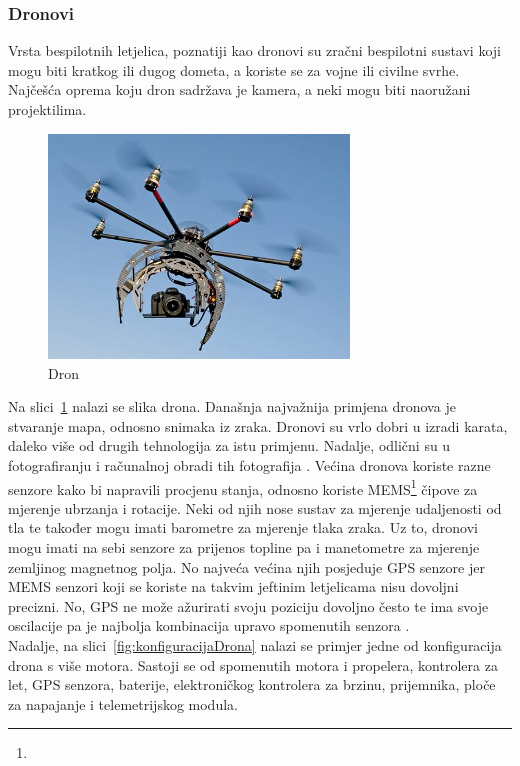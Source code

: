 \documentclass[times, utf8, diplomski]{fer}
\begin{document}
\subsubsection{Dronovi}
Vrsta bespilotnih letjelica, poznatiji kao dronovi su zračni bespilotni sustavi koji mogu biti kratkog ili dugog dometa, a koriste se za vojne ili civilne svrhe. Najčešća oprema koju dron sadržava je kamera, a neki mogu biti naoružani projektilima. 
\begin{figure}[htb]
\centering
\includegraphics[width=8cm]{img/drone.png}
\caption{Dron\protect\footnotemark}
\label{fig:dron}
\end{figure}
Na  slici~\ref{fig:dron}  nalazi  se  slika 
drona. Današnja najvažnija primjena dronova je stvaranje mapa, odnosno snimaka iz zraka. Dronovi su  vrlo dobri u izradi karata, daleko više od drugih tehnologija za istu primjenu. Nadalje, odlični su u fotografiranju i računalnoj  obradi  tih  fotografija \citep[str.~10]{Drones}. Većina dronova koriste razne senzore kako  bi  napravili  procjenu  stanja,  odnosno  koriste  MEMS\footnote{} čipove  za  mjerenje  ubrzanja  i rotacije. Neki od njih nose sustav za mjerenje udaljenosti od tla te također mogu imati barometre za  mjerenje  tlaka  zraka.  Uz  to,  dronovi  mogu  imati  na  sebi senzore  za  prijenos  topline  pa  i manetometre za mjerenje zemljinog magnetnog polja. No najveća većina njih posjeduje GPS senzore jer MEMS senzori koji se koriste na takvim jeftinim letjelicama nisu dovoljni precizni. No, GPS ne može ažurirati svoju poziciju dovoljno često te ima svoje oscilacije pa je najbolja kombinacija  upravo  spomenutih  senzora \citep[str.~13]{Drones}.\\
Nadalje, na slici~\ref{fig:konfiguracijaDrona} nalazi se primjer jedne od konfiguracija drona s više motora. Sastoji  se  od  spomenutih  motora  i  propelera,  kontrolera  za  let,  GPS  senzora,  baterije, elektroničkog kontrolera za brzinu, prijemnika, ploče za napajanje i telemetrijskog modula. 
\end{document}
